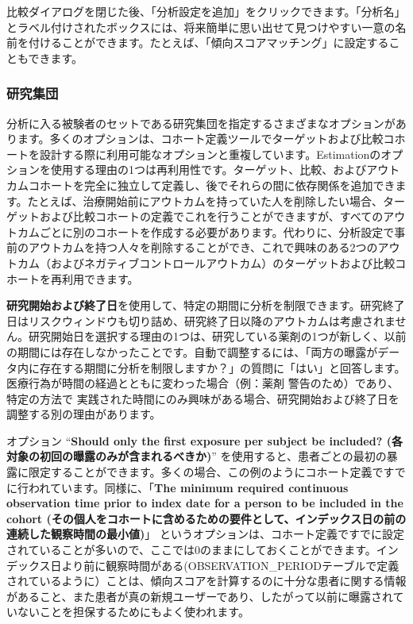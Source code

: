 \documentclass[
  11pt]{book}
\theoremstyle{definition}
\theoremstyle{definition}
\theoremstyle{definition}
\theoremstyle{definition}
\theoremstyle{remark}
\begin{document}
比較ダイアログを閉じた後、「分析設定を追加」をクリックできます。「分析名」とラベル付けされたボックスには、将来簡単に思い出せて見つけやすい一意の名前を付けることができます。たとえば、「傾向スコアマッチング」に設定することもできます。

\subsubsection*{研究集団}\label{ux7814ux7a76ux96c6ux56e3}

分析に入る被験者のセットである研究集団を指定するさまざまなオプションがあります。多くのオプションは、コホート定義ツールでターゲットおよび比較コホートを設計する際に利用可能なオプションと重複しています。Estimationのオプションを使用する理由の1つは再利用性です。ターゲット、比較、およびアウトカムコホートを完全に独立して定義し、後でそれらの間に依存関係を追加できます。たとえば、治療開始前にアウトカムを持っていた人を削除したい場合、ターゲットおよび比較コホートの定義でこれを行うことができますが、すべてのアウトカムごとに別のコホートを作成する必要があります。代わりに、分析設定で事前のアウトカムを持つ人々を削除することができ、これで興味のある2つのアウトカム（およびネガティブコントロールアウトカム）のターゲットおよび比較コホートを再利用できます。

\textbf{研究開始および終了日}を使用して、特定の期間に分析を制限できます。研究終了日はリスクウィンドウも切り詰め、研究終了日以降のアウトカムは考慮されません。研究開始日を選択する理由の1つは、研究している薬剤の1つが新しく、以前の期間には存在しなかったことです。自動で調整するには、「両方の曝露がデータ内に存在する期間に分析を制限しますか？」の質問に「はい」と回答します。医療行為が時間の経過とともに変わった場合（例：薬剤 警告のため）であり、特定の方法で 実践された時間にのみ興味がある場合、研究開始および終了日を調整する別の理由があります。

オプション ``\textbf{Should only the first exposure per subject be included? (各対象の初回の曝露のみが含まれるべきか)}'' を使用すると、患者ごとの最初の暴露に限定することができます。多くの場合、この例のようにコホート定義ですでに行われています。同様に、「\textbf{The minimum required continuous observation time prior to index date for a person to be included in the cohort (その個人をコホートに含めるための要件として、インデックス日の前の連続した観察時間の最小値)}」 というオプションは、コホート定義ですでに設定されていることが多いので、ここでは0のままにしておくことができます。インデックス日より前に観察時間がある(OBSERVATION\_PERIODテーブルで定義されているように）ことは、傾向スコアを計算するのに十分な患者に関する情報があること、また患者が真の新規ユーザーであり、したがって以前に曝露されていないことを担保するためにもよく使われます。
\end{document}
